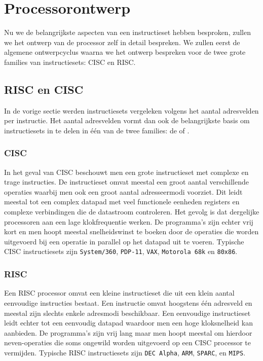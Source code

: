 \section{Processorontwerp}
Nu we de belangrijkste aspecten van een instructieset hebben besproken, zullen we het ontwerp van de processor zelf in detail bespreken. We zullen eerst de algemene ontwerpcyclus waarna we het ontwerp bespreken voor de twee grote families van instructiesets: CISC en RISC.
\subsection{RISC en CISC}
In de vorige sectie werden instructiesets vergeleken volgens het aantal adresvelden per instructie. Het aantal adresvelden vormt dan ook de belangrijkste basis om instructiesets in te delen in \'e\'en van de twee families: de  of .
\subsubsection{CISC}
In het geval van CISC beschouwt men een grote instructieset met complexe en trage instructies. De instructieset omvat meestal een groot aantal verschillende operaties waarbij men ook een groot aantal adresseermodi voorziet. Dit leidt meestal tot een complex datapad met veel functionele eenheden registers en complexe verbindingen die de datastroom controleren. Het gevolg is dat dergelijke processoren aan een lage klokfrequentie werken. De programma's zijn echter vrij kort en men hoopt meestal snelheidswinst te boeken door de operaties die worden uitgevoerd bij een operatie in parallel op het datapad uit te voeren. Typische CISC instructiesets zijn \verb+System/360+, \verb+PDP-11+, \verb+VAX+, \verb+Motorola 68k+ en \verb+80x86+.
\subsubsection{RISC}
Een RISC processor omvat een kleine instructieset die uit een klein aantal eenvoudige instructies bestaat. Een instructie omvat hoogstens \'e\'en adresveld en meestal zijn slechts enkele adresmodi beschikbaar. Een eenvoudige instructieset leidt echter tot een eenvoudig datapad waardoor men een hoge kloksnelheid kan aanbieden. De programma's zijn vrij lang maar men hoopt meestal om hierdoor neven-operaties die soms ongewild worden uitgevoerd op een CISC processor te vermijden. Typische RISC instructiesets zijn \verb+DEC Alpha+, \verb+ARM+, \verb+SPARC+, en \verb+MIPS+.
